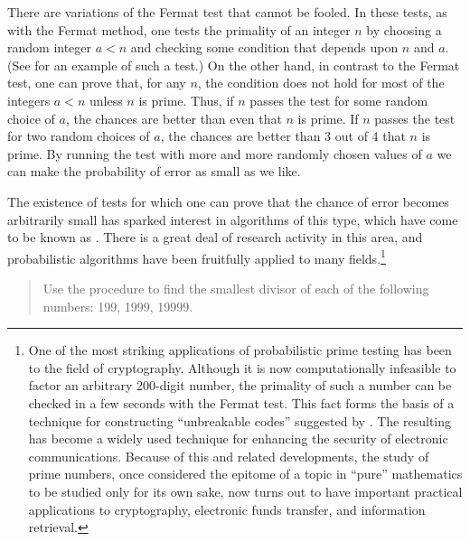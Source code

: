 There are variations of the Fermat test that cannot be fooled.  In these tests,
as with the Fermat method, one tests the primality of an integer \( n \) by
choosing a random integer \( a < n \) and checking some condition that depends
upon \( n \) and \( a \).  (See  for an example of such a test.)
On the other hand, in contrast to the Fermat test, one can prove that, for any
\( n \), the condition does not hold for most of the integers \( a < n \) unless
\( n \) is prime.  Thus, if \( n \) passes the test for some random choice of
\( a \), the chances are better than even that \( n \) is prime.  If \( n \) passes
the test for two random choices of \( a \), the chances are better than 3 out of
4 that \( n \) is prime. By running the test with more and more randomly chosen
values of \( a \) we can make the probability of error as small as we like.

The existence of tests for which one can prove that the chance of error becomes
arbitrarily small has sparked interest in algorithms of this type, which have
come to be known as .  There is a great deal
of research activity in this area, and probabilistic algorithms have been
fruitfully applied to many fields.\footnote{One of the most striking
applications of probabilistic prime testing has been to the field of
cryptography.  Although it is now computationally infeasible to factor an
arbitrary 200-digit number, the primality of such a number can be checked in a
few seconds with the Fermat test.  This fact forms the basis of a technique for
constructing ``unbreakable codes'' suggested by .
The resulting  has become a widely used
technique for enhancing the security of electronic communications.  Because of
this and related developments, the study of prime numbers, once considered the
epitome of a topic in ``pure'' mathematics to be studied only for its own sake,
now turns out to have important practical applications to cryptography,
electronic funds transfer, and information retrieval.}

\begin{quote}
 Use the 
procedure to find the smallest divisor of each of the following numbers: 199,
1999, 19999.
\end{quote}

